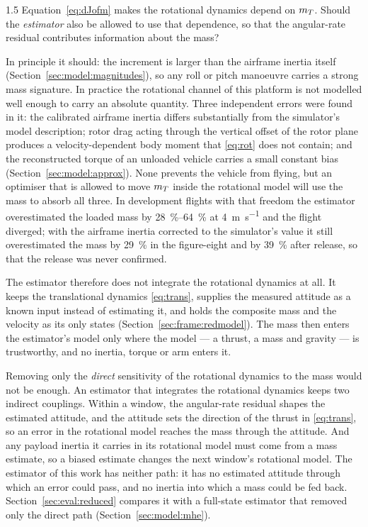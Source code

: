 \begin{spacing}{1.5}
Equation~\eqref{eq:dJofm} makes the rotational dynamics depend on $m_T$. Should
the \emph{estimator} also be allowed to use that dependence, so that the
angular-rate residual contributes information about the mass?

In principle it should: the increment is larger than the airframe inertia
itself (Section~\ref{sec:model:magnitudes}), so any roll or pitch manoeuvre
carries a strong mass signature. In practice the rotational channel of this
platform is not modelled well enough to carry an absolute quantity. Three
independent errors were found in it: the calibrated airframe inertia differs
substantially from the simulator's model description; rotor drag acting
through the vertical offset of the rotor plane produces a velocity-dependent body
moment that \eqref{eq:rot} does not contain; and the reconstructed torque of an
unloaded vehicle carries a small constant bias
(Section~\ref{sec:model:approx}). None prevents the vehicle from flying, but an
optimiser that is allowed to move $m_T$ inside the rotational model will use the
mass to absorb all three. In development flights with that freedom the estimator
overestimated the loaded mass by \SIrange{28}{64}{\percent} at
\SI{4}{\meter\per\second} and the flight diverged; with the airframe inertia
corrected to the simulator's value it still overestimated the mass by
\SI{29}{\percent} in the figure-eight and by \SI{39}{\percent} after release, so
that the release was never confirmed.

The estimator therefore does not integrate the rotational dynamics at
all. It keeps the translational dynamics \eqref{eq:trans}, supplies the measured
attitude as a known input instead of estimating it, and holds the composite mass
and the velocity as its only states (Section~\ref{sec:frame:redmodel}). The mass
then enters the estimator's model only where the model --- a thrust, a mass and
gravity --- is trustworthy, and no inertia, torque or arm enters it.

Removing only the \emph{direct} sensitivity of the rotational dynamics to the
mass would not be enough. An estimator that integrates the rotational dynamics
keeps two indirect couplings. Within a window, the angular-rate residual shapes
the estimated attitude, and the attitude sets the direction of the thrust in
\eqref{eq:trans}, so an error in the rotational model reaches the mass through
the attitude. And any payload inertia it carries in its rotational model must
come from a mass estimate, so a biased estimate changes the next window's
rotational model. The estimator of this work has neither path: it has no
estimated attitude through which an error could pass, and no inertia into which a
mass could be fed back. Section~\ref{sec:eval:reduced} compares it with a
full-state estimator that removed only the direct path
(Section~\ref{sec:model:mhe}).


\end{spacing}
